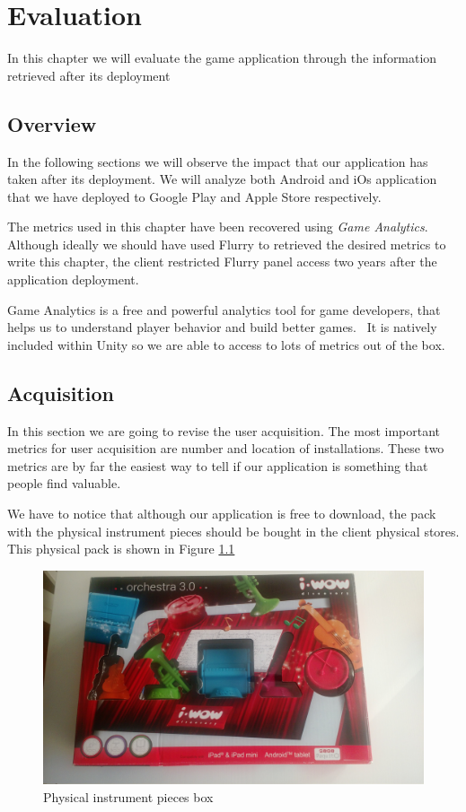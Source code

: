 \chapter{Evaluation}
\label{chap:evaluation}
\begin{chapterintro}
In this chapter we will evaluate the game application through the information retrieved after its deployment
\end{chapterintro}

\cleardoublepage
\section{Overview}
In the following sections we will observe the impact that our application has taken after its deployment. We will analyze both Android and iOs application that we have deployed to Google Play and Apple Store respectively.

The metrics used in this chapter have been recovered using \textit{Game Analytics}. Although ideally we should have used Flurry to retrieved the desired metrics to write this chapter, the client restricted Flurry panel access two years after the application deployment.

Game Analytics is a free and powerful analytics tool for game developers, that helps us to understand player behavior and build better games.~\cite{gametrics1} It is natively included within Unity so we are able to access to lots of metrics out of the box.

\section{Acquisition}

In this section we are going to revise the user acquisition. The most important metrics for user acquisition are number and location of installations. These two metrics are by far the easiest way to tell if our application is something that people find valuable.

We have to notice that although our application is free to download, the pack with the physical instrument pieces should be bought in the client physical stores. This physical pack is shown in Figure \ref{fig:instruments-pack}

\begin{figure}[h]
\centering
\includegraphics[width=350pt]{graphics/evaluation/instruments_pack.jpg}
\caption{Physical instrument pieces box}
\label{fig:instruments-pack}
\end{figure}

